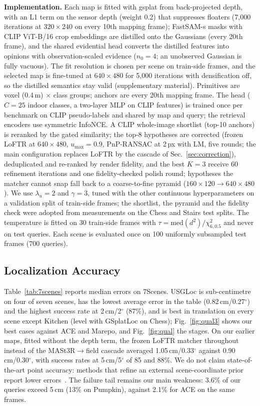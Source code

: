 \documentclass[journal]{IEEEtran}
\newcommand{\method}{USGLoc}
\begin{document}
\textbf{Implementation.} Each map is fitted with gsplat from back-projected depth, with an L1 term on the sensor depth (weight 0.2) that suppresses floaters (7{,}000 iterations at $320{\times}240$ on every 10th mapping frame); FastSAM-s masks with CLIP ViT-B/16 crop embeddings are distilled onto the Gaussians (every 20th frame), and the shared evidential head converts the distilled features into opinions with observation-scaled evidence ($n_0{=}4$; an unobserved Gaussian is fully vacuous). The fit resolution is chosen per scene on train-side frames, and the selected map is fine-tuned at $640{\times}480$ for 5{,}000 iterations with densification off, so the distilled semantics stay valid (supplementary material). Primitives are voxel (0.4\,m) $\times$ class groups; anchors are every 20th mapping frame. The head ($C{=}25$ indoor classes, a two-layer MLP on CLIP features) is trained once per benchmark on CLIP pseudo-labels and shared by map and query; the retrieval encoders use symmetric InfoNCE. A CLIP whole-image shortlist (top-10 anchors) is reranked by the gated similarity; the top-8 hypotheses are corrected (frozen LoFTR at $640{\times}480$, $u_{\max}{=}0.9$, PnP-RANSAC at 2\,px with LM, five rounds; the main configuration replaces LoFTR by the cascade of Sec.~\ref{sec:correction}), deduplicated and re-ranked by render fidelity, and the best $K{=}3$ receive 60 refinement iterations and one fidelity-checked polish round; hypotheses the matcher cannot snap fall back to a coarse-to-fine pyramid ($160{\times}120\to640{\times}480$). We use $\lambda_u{=}2$ and $\gamma{=}3$, tuned with the other continuous hyperparameters on a validation split of train-side frames; the shortlist, the pyramid and the fidelity check were adopted from measurements on the Chess and Stairs test splits. The temperature is fitted on 30 train-side frames with $\tau=\mathrm{med}(d^2)/\chi^2_{6,0.5}$ and never on test queries. Each scene is evaluated once on 100 uniformly subsampled test frames (700 queries).

\subsection{Localization Accuracy}
Table~\ref{tab:7scenes} reports median errors on 7Scenes. \method{} is sub-centimetre on four of seven scenes, has the lowest average error in the table (0.82\,cm/0.27$^\circ$) and the highest success rate at 2\,cm/2$^\circ$ (87\%), and is best in translation on every scene except Kitchen (level with GSplatLoc on Chess); Fig.~\ref{fig:qual3} shows our best cases against ACE and Marepo, and Fig.~\ref{fig:qual} the stages. On our earlier maps, fitted without the depth term, the frozen LoFTR matcher throughout instead of the MASt3R$\to$field cascade averaged 1.05\,cm/0.33$^\circ$ against 0.90\,cm/0.30$^\circ$, with success rates at 5\,cm/5$^\circ$ of 85 and 88\%. We do not claim state-of-the-art point accuracy: methods that refine an external scene-coordinate prior report lower errors~\cite{gscpr}. The failure tail remains our main weakness: 3.6\% of our queries exceed 5\,cm (13\% on Pumpkin), against 2.1\% for ACE on the same frames.
\end{document}
